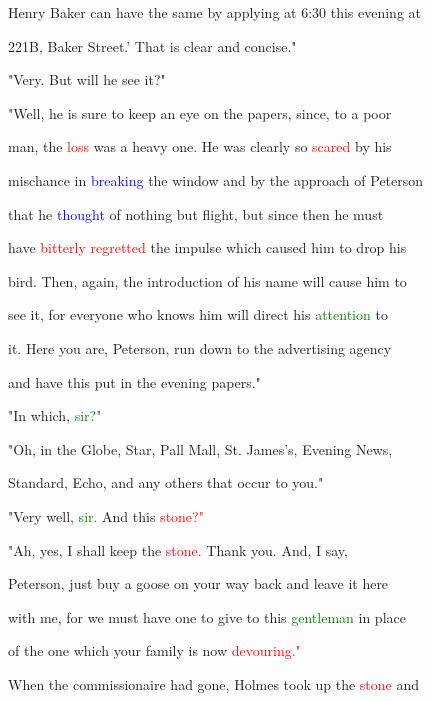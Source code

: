  Henry Baker can have the same by applying at 6:30 this evening at

 221B, Baker Street.' That is clear and concise."



 "Very. But will he see it?"



 "Well, he is sure to keep an eye on the papers, since, to a poor

 man, the \textcolor{red}{loss} was a heavy one. He was clearly so \textcolor{red}{scared} by his

 mischance in \textcolor{blue}{breaking} the window and by the approach of Peterson

 that he \textcolor{blue}{thought} of nothing but flight, but since then he must

 have \textcolor{red}{bitterly} \textcolor{red}{regretted} the impulse which caused him to drop his

 bird. Then, again, the introduction of his name will cause him to

 see it, for everyone who knows him will direct his \textcolor{green}{attention} to

 it. Here you are, Peterson, run down to the advertising agency

 and have this put in the evening papers."



 "In which, \textcolor{green}{sir?"}



 "Oh, in the Globe, \textcolor{BurntOrange}{Star,} Pall Mall, St. James's, Evening News,

 Standard, Echo, and any others that occur to you."



 "Very well, \textcolor{green}{sir.} And this \textcolor{red}{stone?"}



 "Ah, yes, I shall keep the \textcolor{red}{stone.} Thank you. And, I say,

 Peterson, just buy a goose on your way back and \textcolor{BurntOrange}{leave} it here

 with me, for we must have one to give to this \textcolor{green}{gentleman} in place

 of the one which your family is now \textcolor{red}{devouring."}



 When the commissionaire had gone, Holmes took up the \textcolor{red}{stone} and

